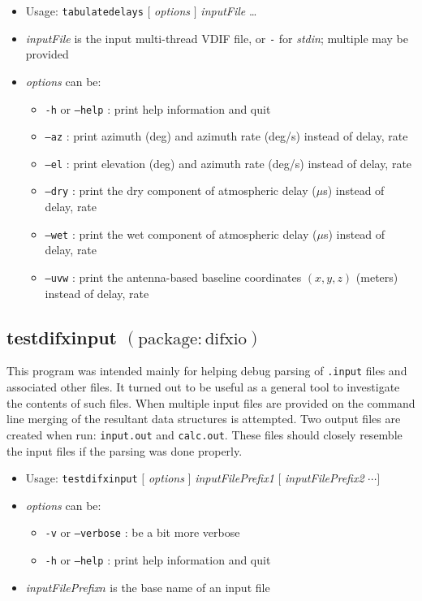 \begin{itemize}
\item[] Usage: {\tt tabulatedelays} $ [ $ {\em options} $ ] $ {\em inputFile} \ldots
\item[] {\em inputFile} is the input multi-thread VDIF file, or {\tt -} for {\em stdin}; multiple may be provided
\item[] {\em options} can be:
\begin{itemize}
\item[] {\tt -h} or {\tt --help} : print help information and quit
\item[] {\tt --az} : print azimuth (deg) and azimuth rate (deg/s) instead of delay, rate
\item[] {\tt --el} : print elevation (deg) and azimuth rate (deg/s) instead of delay, rate
\item[] {\tt --dry} : print the dry component of atmospheric delay ($\mu$s) instead of delay, rate
\item[] {\tt --wet} : print the wet component of atmospheric delay ($\mu$s) instead of delay, rate
\item[] {\tt --uvw} : print the antenna-based baseline coordinates $(x, y, z)$ (meters) instead of delay, rate
\end{itemize}
\end{itemize}





\subsection{testdifxinput {\small $\mathrm{(package: difxio)}$}} \label{sec:testdifxinput}

This program was intended mainly for helping debug parsing of {\tt .input} files and associated other files.
It turned out to be useful as a general tool to investigate the contents of such files.
When multiple input files are provided on the command line merging of the resultant data structures is attempted.
Two output files are created when run: {\tt input.out} and {\tt calc.out}.
These files should closely resemble the input files if the parsing was done properly.

\begin{itemize}
\item[] Usage: {\tt testdifxinput} $[$ {\em options} $]$ {\em inputFilePrefix1} $[$ {\em inputFilePrefix2} $ \cdots ]$
\item[] {\em options} can be:
\begin{itemize}
\item[] {\tt -v} or {\tt --verbose} : be a bit more verbose
\item[] {\tt -h} or {\tt --help} : print help information and quit
\end{itemize}
\item[] {\em inputFilePrefix}$n$ is the base name of an input file
\end{itemize}






